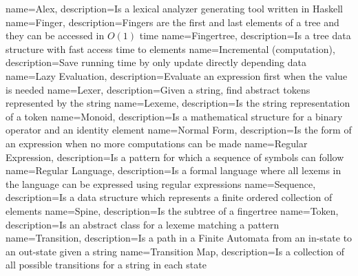 
{
        name=Alex,
        description={Is a lexical analyzer generating tool written in Haskell}
}
{
        name=Finger,
        description={Fingers are the first and last elements of a tree and they
            can be accessed in $O(1)$ time}
}
{
        name=Fingertree,
            description={Is a tree data structure with fast access time to elements}
}
{
        name=Incremental (computation),
            description={Save running time by only update directly depending data}
}
{
        name=Lazy Evaluation,
            description={Evaluate an expression first when the value is needed}
}
{
        name=Lexer,
            description={Given a string, find abstract tokens represented by the string}
}
{
        name=Lexeme,
            description={Is the string representation of a token}
}
{
        name=Monoid,
            description={Is a mathematical structure for a binary operator and an identity element}
}
{
        name=Normal Form,
            description={Is the form of an expression when no more computations can be made}
}
{
        name=Regular Expression,
            description={Is a pattern for which a sequence of symbols can follow}
}
{
        name=Regular Language,
            description={Is a formal language where all lexems in the language
		can be expressed using regular expressions}
}
{
        name=Sequence,
            description={Is a data structure which represents a finite
            ordered collection of elements}
}
{
        name=Spine,
            description={Is the subtree of a fingertree}
}
{
        name=Token,
            description={Is an abstract class for a lexeme matching a pattern}
}
{
        name=Transition,
            description={Is a path in a Finite Automata from an in-state to an out-state
            given a string}
}
{
        name=Transition Map,
            description={Is a collection of all possible transitions for a
            string in each state}
}
